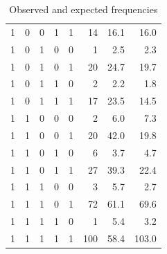 \begin{table}[ht]
\begin{tabular}{rrrrrrrr}
  1 & 0 & 0 & 1 & 1 & 14 & 16.1 & 16.0 \\ 
  1 & 0 & 1 & 0 & 0 & 1 & 2.5 & 2.3 \\ 
  1 & 0 & 1 & 0 & 1 & 20 & 24.7 & 19.7 \\ 
  1 & 0 & 1 & 1 & 0 & 2 & 2.2 & 1.8 \\ 
  1 & 0 & 1 & 1 & 1 & 17 & 23.5 & 14.5 \\ 
  1 & 1 & 0 & 0 & 0 & 2 & 6.0 & 7.3 \\ 
  1 & 1 & 0 & 0 & 1 & 20 & 42.0 & 19.8 \\ 
  1 & 1 & 0 & 1 & 0 & 6 & 3.7 & 4.7 \\ 
  1 & 1 & 0 & 1 & 1 & 27 & 39.3 & 22.4 \\ 
  1 & 1 & 1 & 0 & 0 & 3 & 5.7 & 2.7 \\ 
  1 & 1 & 1 & 0 & 1 & 72 & 61.1 & 69.6 \\ 
  1 & 1 & 1 & 1 & 0 & 1 & 5.4 & 3.2 \\ 
  1 & 1 & 1 & 1 & 1 & 100 & 58.4 & 103.0 \\ 
   \hline
\end{tabular}
\caption{Observed and expected frequencies} 
\label{tab:obs}
\end{table}
